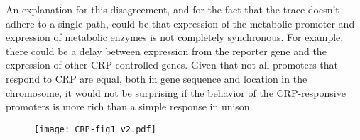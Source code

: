{An explanation for this disagreement, and for the fact that the trace doesn't adhere to a single path, 
could be that
expression of the metabolic promoter and expression of metabolic enzymes is not 
completely synchronous.
%
For example, there could be a delay between expression from the reporter gene and the expression of other CRP-controlled genes.
%
Given that not all promoters that respond to CRP are equal, both in gene sequence and location in the chromosome,
it would not be surprising if the behavior of the CRP-responsive promoters is more rich
than a simple response in unison.
}


%
%




\begingroup %
\begin{figure}
	\centering
	\texttt{[image: CRP-fig1\_v2.pdf]}
	\clearpage %
\end{figure}	

\clearpage


